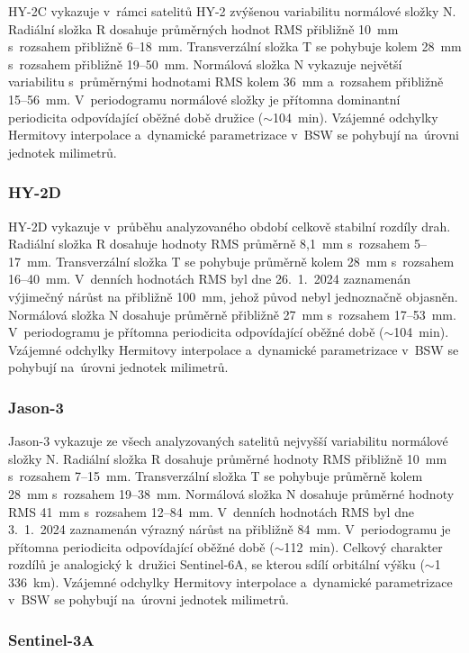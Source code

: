 HY-2C vykazuje v~rámci satelitů HY-2 zvýšenou variabilitu normálové složky N. Radiální složka R dosahuje průměrných hodnot RMS přibližně 10~mm s~rozsahem přibližně 6--18~mm. Transverzální složka T se pohybuje kolem 28~mm s~rozsahem přibližně 19--50~mm. Normálová složka N vykazuje největší variabilitu s~průměrnými hodnotami RMS kolem 36~mm a~rozsahem přibližně 15--56~mm. V~periodogramu normálové složky je přítomna dominantní periodicita odpovídající oběžné době družice ($\sim$104~min). Vzájemné odchylky Hermitovy interpolace a~dynamické parametrizace v~BSW se pohybují na~úrovni jednotek milimetrů.

\subsubsection{HY-2D}

HY-2D vykazuje v~průběhu analyzovaného období celkově stabilní rozdíly 
drah. Radiální složka R dosahuje hodnoty RMS průměrně 8{,}1~mm s~rozsahem 
5--17~mm. Transverzální složka T se pohybuje průměrně kolem 28~mm 
s~rozsahem 16--40~mm. V~denních hodnotách RMS byl dne 26.~1.~2024 
zaznamenán výjimečný nárůst na přibližně 100~mm, jehož původ nebyl 
jedno\-značně objasněn. Normálová složka N dosahuje průměrně přibližně 
27~mm s~rozsahem 17--53~mm. V~periodogramu je přítomna periodicita 
odpovídající oběžné době ($\sim$104~min). Vzájemné odchylky Hermitovy 
interpolace a~dynamické parametrizace v~BSW se pohybují na~úrovni 
jednotek milimetrů.

\subsubsection{Jason-3}

Jason-3 vykazuje ze všech analyzovaných satelitů nejvyšší variabilitu normálové složky N. Radiální složka R dosahuje průměrné hodnoty RMS přibližně 10~mm s~rozsahem 7--15~mm. Transverzální složka T se pohybuje průměrně kolem 28~mm s~rozsahem 19--38~mm. Normálová složka N dosahuje průměrné hodnoty RMS 41~mm s~rozsahem 12--84~mm. V~denních hodnotách RMS byl dne 3.~1.~2024 zaznamenán výrazný nárůst na přibližně 84~mm. V~periodogramu je přítomna periodicita odpovídající oběžné době ($\sim$112~min). Celkový charakter rozdílů je analogický k~družici Sentinel-6A, se kterou sdílí orbitální výšku ($\sim$1\,336~km). Vzájemné odchylky Hermitovy interpolace a~dynamické parametrizace v~BSW se pohybují na~úrovni jednotek milimetrů.

\subsubsection{Sentinel-3A}

